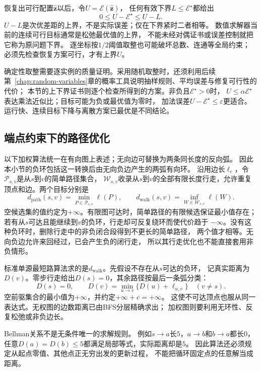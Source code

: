 恢复出可行配置\(\widehat{\bm z}\)以后，令\(U=\mathcal E(\widehat{\bm z})\)，
任何有效下界\(L\leq\mathcal E^\star\)都给出
\[
  0\leq U-\mathcal E^\star\leq U-L.
\]
\(U-L\)是次优差距的上界，不是实际误差；仅在下界紧时二者相等。
数值求解器当前的连续可行目标通常是松弛最优值的上界，
不能未经对偶证书或误差控制就把它称为原问题下界。
逐坐标按\(1/2\)阈值取整也可能破坏总数、连通等全局约束；
必须先检查恢复方案可行，才有上界\(U\)。

确定性取整需要逐实例的质量证明。采用随机取整时，还须利用后续
第~\ref{chap:random-variables}章的概率工具说明抽样规则、平均误差与修复可行性的代价；
本节的上下界证书则逐个检查所得到的方案。非负且\(\mathcal E^\star>0\)时，
\(U\leq\alpha\mathcal E^\star\)表达乘法近似比；目标可能为负或最优值为零时，
加法误差\(U-\mathcal E^\star\leq\varepsilon\)更适合。
运行快、连续目标下降与离散方案已最优是不同结论。

\subsection{端点约束下的路径优化}
\label{sec:graph-theory-shortest-paths}

以下加权算法统一在有向图上表述；无向边可替换为两条同长度的反向弧。
因此本小节的负环包括这一转换后由无向负边产生的两弧有向环。
沿用边长\(\ell_e\)，令\(\mathcal P_{s,v}\)是从\(s\)到\(v\)的简单路径集合，
\(\mathcal W_{s,v}\)收录从\(s\)到\(v\)的全部有限长度行走，允许重复顶点和边。两个目标分别是
\[
  d_{\mathrm{path}}(s,v)=\min_{P\in\mathcal P_{s,v}}\ell(P),
  \qquad
  d_{\mathrm{walk}}(s,v)=\inf_{W\in\mathcal W_{s,v}}\ell(W).
\]
空候选集的值约定为\(+\infty\)。有限图可达时，简单路径的有限候选保证最小值存在；
若有从\(s\)可达且能继续到\(v\)的负环，行走却可反复绕环而使代价趋于
\(-\infty\)。没有这种负环时，删除行走中的非负闭合段得到不更长的简单路径，
两个值才相等。无向负边允许来回经过，已会产生负的闭行走，
所以其行走优化也不能直接套用非负情形。

标准单源最短路算法求的是\(d_{\mathrm{walk}}\)。先假设不存在从\(s\)可达的负环，
记真实距离为\(D(v)\)。零步行走给出\(D(s)=0\)，其余路径按最后一条弧分类：
\begin{equation}
  D(s)=0,\qquad
  D(v)=\min_{u\to v}\{D(u)+\ell_{u,v}\}\quad(v\neq s).
  \label{eq:graph-theory-shortest-path-bellman}
\end{equation}
空前驱集合的最小值为\(+\infty\)，并约定\(+\infty+c=+\infty\)。
这使不可达顶点也服从同一表达式。无权图的边数距离已由BFS分层精确求出；
加权图则要利用无环性、反复松弛或非负边长。

Bellman关系不是无条件唯一的求解规则。
例如\(s\to a\)长\(5\)，\(a\to b\)和\(b\to a\)都长\(0\)，
任意\(D(a)=D(b)\leq5\)都满足局部等式，实际距离却是\(5\)。
因此算法还必须规定从起点零值、其他点正无穷出发的更新过程，
不能把循环固定点的任意解当成距离。

